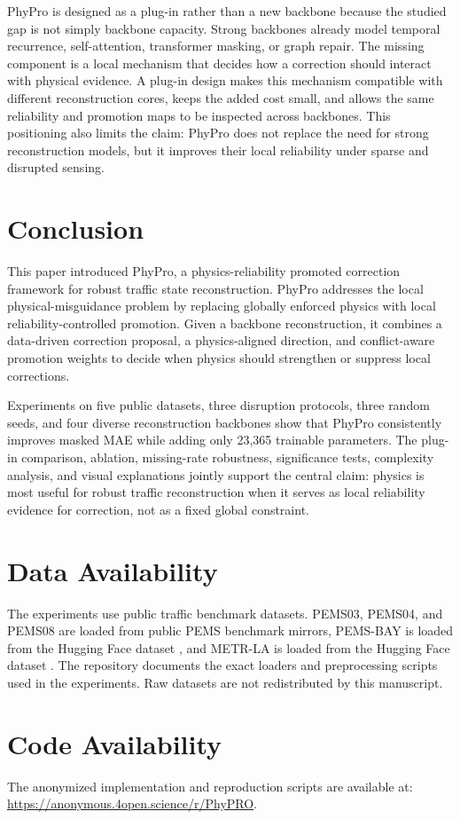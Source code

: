 \documentclass[preprint,12pt]{elsarticle}
\begin{document}
PhyPro is designed as a plug-in rather than a new backbone because the studied gap is not simply backbone capacity. Strong backbones already model temporal recurrence, self-attention, transformer masking, or graph repair. The missing component is a local mechanism that decides how a correction should interact with physical evidence. A plug-in design makes this mechanism compatible with different reconstruction cores, keeps the added cost small, and allows the same reliability and promotion maps to be inspected across backbones. This positioning also limits the claim: PhyPro does not replace the need for strong reconstruction models, but it improves their local reliability under sparse and disrupted sensing.

\section{Conclusion}
This paper introduced PhyPro, a physics-reliability promoted correction framework for robust traffic state reconstruction. PhyPro addresses the local physical-misguidance problem by replacing globally enforced physics with local reliability-controlled promotion. Given a backbone reconstruction, it combines a data-driven correction proposal, a physics-aligned direction, and conflict-aware promotion weights to decide when physics should strengthen or suppress local corrections.

Experiments on five public datasets, three disruption protocols, three random seeds, and four diverse reconstruction backbones show that PhyPro consistently improves masked MAE while adding only 23,365 trainable parameters. The plug-in comparison, ablation, missing-rate robustness, significance tests, complexity analysis, and visual explanations jointly support the central claim: physics is most useful for robust traffic reconstruction when it serves as local reliability evidence for correction, not as a fixed global constraint.

\section*{Data Availability}
The experiments use public traffic benchmark datasets. PEMS03, PEMS04, and PEMS08 are loaded from public PEMS benchmark mirrors, PEMS-BAY is loaded from the Hugging Face dataset , and METR-LA is loaded from the Hugging Face dataset . The repository documents the exact loaders and preprocessing scripts used in the experiments. Raw datasets are not redistributed by this manuscript.

\section*{Code Availability}
The anonymized implementation and reproduction scripts are available at: \url{https://anonymous.4open.science/r/PhyPRO}.



\end{document}
